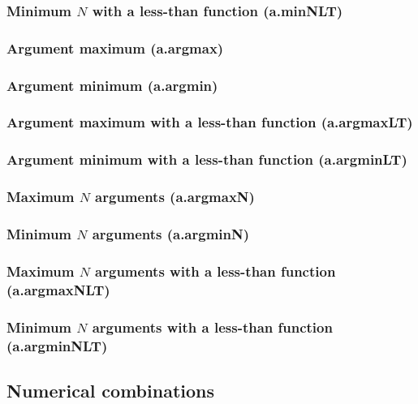 \documentclass{article}
\theoremstyle{definition}
\begin{document}
\subsubsection{Minimum $N$ with a less-than function (a.minNLT)}

\subsubsection{Argument maximum (a.argmax)}

\subsubsection{Argument minimum (a.argmin)}

\subsubsection{Argument maximum with a less-than function (a.argmaxLT)}

\subsubsection{Argument minimum with a less-than function (a.argminLT)}

\subsubsection{Maximum $N$ arguments (a.argmaxN)}

\subsubsection{Minimum $N$ arguments (a.argminN)}

\subsubsection{Maximum $N$ arguments with a less-than function (a.argmaxNLT)}

\subsubsection{Minimum $N$ arguments with a less-than function (a.argminNLT)}

\subsection{Numerical combinations}
\end{document}
